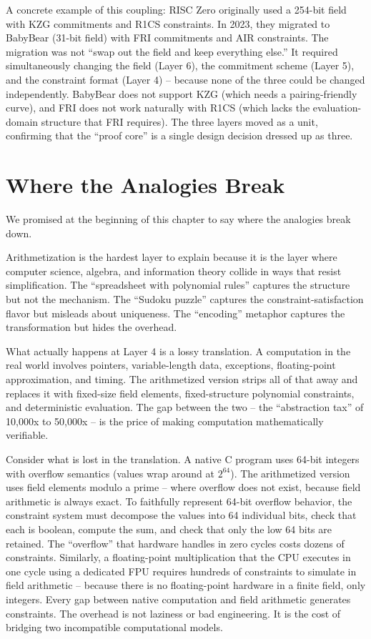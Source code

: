 \documentclass[
  11pt,
  openany]{report}
\begin{document}
A concrete example of this coupling: RISC Zero originally used a 254-bit field
with KZG commitments and R1CS constraints. In 2023, they migrated to BabyBear
(31-bit field) with FRI commitments and AIR constraints. The migration was not
``swap out the field and keep everything else.'' It required simultaneously
changing the field (Layer 6), the commitment scheme (Layer 5), and the
constraint format (Layer 4) -- because none of the three could be changed
independently. BabyBear does not support KZG (which needs a pairing-friendly
curve), and FRI does not work naturally with R1CS (which lacks the
evaluation-domain structure that FRI requires). The three layers moved as a
unit, confirming that the ``proof core'' is a single design decision dressed up
as three.

\section{Where the Analogies Break}\label{where-the-analogies-break}

We promised at the beginning of this chapter to say where the analogies break
down.

Arithmetization is the hardest layer to explain because it is the layer where
computer science, algebra, and information theory collide in ways that resist
simplification. The ``spreadsheet with polynomial rules'' captures the structure
but not the mechanism. The ``Sudoku puzzle'' captures the
constraint-satisfaction flavor but misleads about uniqueness. The ``encoding''
metaphor captures the transformation but hides the overhead.

What actually happens at Layer 4 is a lossy translation. A computation in the
real world involves pointers, variable-length data, exceptions, floating-point
approximation, and timing. The arithmetized version strips all of that away and
replaces it with fixed-size field elements, fixed-structure polynomial
constraints, and deterministic evaluation. The gap between the two -- the
``abstraction tax'' of 10,000x to 50,000x -- is the price of making computation
mathematically verifiable.

Consider what is lost in the translation. A native C program uses 64-bit
integers with overflow semantics (values wrap around at \(2^{64}\)). The
arithmetized version uses field elements modulo a prime -- where overflow does
not exist, because field arithmetic is always exact. To faithfully represent
64-bit overflow behavior, the constraint system must decompose the values into
64 individual bits, check that each is boolean, compute the sum, and check that
only the low 64 bits are retained. The ``overflow'' that hardware handles in
zero cycles costs dozens of constraints. Similarly, a floating-point
multiplication that the CPU executes in one cycle using a dedicated FPU requires
hundreds of constraints to simulate in field arithmetic -- because there is no
floating-point hardware in a finite field, only integers. Every gap between
native computation and field arithmetic generates constraints. The overhead is
not laziness or bad engineering. It is the cost of bridging two incompatible
computational models.
\end{document}
